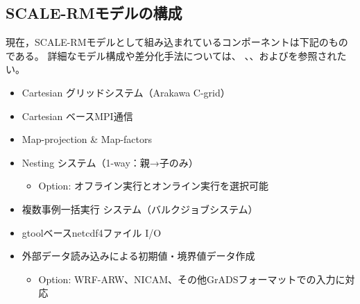 \subsection{SCALE-RMモデルの構成}
現在，SCALE-RMモデルとして組み込まれているコンポーネントは下記のものである。
詳細なモデル構成や差分化手法については、
\cite{scale_2015}、\cite{satoy_2015b}、および\cite{nishizawa_2015}を参照されたい。\\


\begin{itemize}
 \item Cartesian グリッドシステム（Arakawa C-grid）
 \item Cartesian ベースMPI通信
 \item Map-projection \& Map-factors
 \item Nesting システム（1-way：親→子のみ）
   \begin{itemize}
    \item Option: オフライン実行とオンライン実行を選択可能
   \end{itemize}
 \item 複数事例一括実行 システム（バルクジョブシステム）
 \item gtoolベースnetcdf4ファイル I/O
 \item 外部データ読み込みによる初期値・境界値データ作成
   \begin{itemize}
    \item Option: WRF-ARW、NICAM、その他GrADSフォーマットでの入力に対応
   \end{itemize}
\end{itemize}

